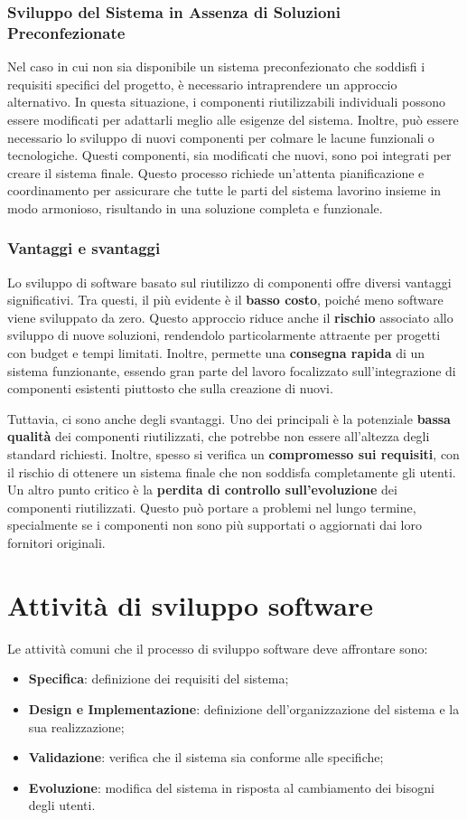\subsubsection{Sviluppo del Sistema in Assenza di Soluzioni Preconfezionate}
Nel caso in cui non sia disponibile un sistema preconfezionato che soddisfi i
requisiti specifici del progetto, è necessario intraprendere un approccio alternativo.
In questa situazione, i componenti riutilizzabili individuali possono essere modificati
per adattarli meglio alle esigenze del sistema. Inoltre, può essere necessario lo
sviluppo di nuovi componenti per colmare le lacune funzionali o tecnologiche. Questi
componenti, sia modificati che nuovi, sono poi integrati per creare il sistema finale.
Questo processo richiede un'attenta pianificazione e coordinamento per assicurare che
tutte le parti del sistema lavorino insieme in modo armonioso, risultando in una
soluzione completa e funzionale.
\subsubsection{Vantaggi e svantaggi}
Lo sviluppo di software basato sul riutilizzo di componenti offre diversi vantaggi
significativi. Tra questi, il più evidente è il \textbf{basso costo}, poiché meno
software viene sviluppato da zero. Questo approccio riduce anche il \textbf{rischio}
associato allo sviluppo di nuove soluzioni, rendendolo particolarmente attraente per
progetti con budget e tempi limitati. Inoltre, permette una \textbf{consegna rapida}
di un sistema funzionante, essendo gran parte del lavoro focalizzato sull'integrazione
di componenti esistenti piuttosto che sulla creazione di nuovi.

Tuttavia, ci sono anche degli svantaggi. Uno dei principali è la potenziale
\textbf{bassa qualità} dei componenti riutilizzati, che potrebbe non essere all'altezza
degli standard richiesti. Inoltre, spesso si verifica un \textbf{compromesso sui requisiti},
con il rischio di ottenere un sistema finale che non soddisfa completamente gli utenti.
Un altro punto critico è la \textbf{perdita di controllo sull'evoluzione} dei componenti
riutilizzati. Questo può portare a problemi nel lungo termine, specialmente se i
componenti non sono più supportati o aggiornati dai loro fornitori originali.

\section{Attività di sviluppo software}
Le attività comuni che il processo di sviluppo software deve affrontare sono:
\begin{itemize}
  \item \textbf{Specifica}: definizione dei requisiti del sistema;
  \item \textbf{Design e Implementazione}: definizione dell'organizzazione del sistema e
  la sua realizzazione;
  \item \textbf{Validazione}: verifica che il sistema sia conforme alle specifiche;
  \item \textbf{Evoluzione}: modifica del sistema in risposta al cambiamento 
  dei bisogni degli utenti.
\end{itemize}
